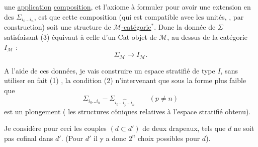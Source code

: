 une \uline{application} \uline{composition}, et l'axiome à
formuler pour avoir une extension 
en des \(\Sigma_{i_0\ldots i_n}\), est que cette composition
(qui est compatible avec les unités, ,
par construction) soit une structure de
\uline{\(\mathcal M\)-catégorie}\(^*\). 
Donc la donnée de \(\Sigma\) satisfaisant (3)
équivaut à celle d'un Cat-objet de \(\mathcal M\),
au dessus de la catégorie  \(I_{\mathcal M}\) :
\[
 \Sigma_{\mathcal M}\longrightarrow I_{\mathcal M}.
\]


A l'aide de ces données, je vais
construire un espace stratifié de type \(I\),
sans utiliser en fait 
(1) , la condition (2) n'intervenant
que sous la forme plus faible que
\[
 \Sigma_{i_0\ldots i_n}
 -\Sigma_{i_0\ldots\widehat{i_p}\ldots i_n}\qquad(p\ne n)
\]
est un plongement 
( les structures côniques
relatives à l'espace stratifié obtenu).

Je considère pour ceci les couples
 \((d\subset d')\) de deux drapeaux,
 tels que
\(d\)  ne soit pas cofinal dans \(d'\).
(Pour \(d'\) 
il y a donc \(2^n\) choix possibles pour \(d\)).


